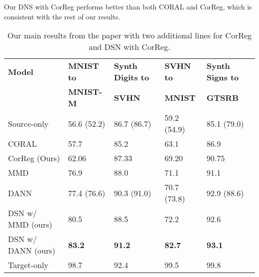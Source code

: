 \documentclass{article}
\begin{document}
Our DNS with CorReg performs better than both CORAL and CorReg, which is consistent with the rest of our results.

\begin{table}[h]
\centering
\caption{Our main results from the paper with two additional lines for CorReg and DSN with CorReg.}
\label{tab:results}
\begin{tabular}{ | l | l | l | l | l | }
\hline
\bf Model   & \bf MNIST to & \bf Synth Digits to &\bf SVHN to  &\bf Synth Signs to \\
 &\bf MNIST-M  &\bf SVHN        &\bf MNIST &\bf GTSRB     \\ \hline \hline
Source-only  & 56.6 (52.2) & 86.7 (86.7)      & 59.2 (54.9) & 85.1  (79.0)    \\ \hline \hline
CORAL \cite{sun2015return} & 57.7 & 85.2       &  63.1     & 86.9        \\ \hline
CorReg (Ours)  & 62.06 & 87.33       & 69.20 & 90.75     \\ \hline\hline
MMD  \cite{tzeng2015ddc,long2015learning}  & 76.9 & 88.0 & 71.1 & 91.1 \\ \hline 
DANN \cite{ganin2016domain}  & 77.4 (76.6)  &  90.3 (91.0)    & 70.7 (73.8)  &     92.9 (88.6) \\ \hline
DSN w/ MMD (ours)  & 80.5 & 88.5  & 72.2   & 92.6 \\ \hline
DSN w/ DANN (ours) & \textbf{83.2} & \textbf{91.2} & \textbf{82.7} & \textbf{93.1} \\ \hline\hline
Target-only  & 98.7 & 92.4  & 99.5 & 99.8  \\ \hline
\end{tabular}
\end{table}
\end{document}
